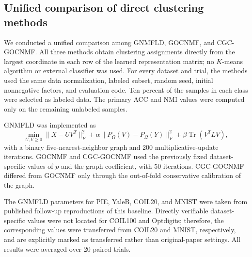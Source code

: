 \subsection{Unified comparison of direct clustering methods}
\label{subsec:unified_direct_comparison}

We conducted a unified comparison among GNMFLD, GOCNMF, and
CGC-GOCNMF. All three methods obtain clustering assignments directly from the
largest coordinate in each row of the learned representation matrix; no
\(K\)-means algorithm or external classifier was used. For every dataset and
trial, the methods used the same data normalization, labeled subset, random
seed, initial nonnegative factors, and evaluation code. Ten percent of the
samples in each class were selected as labeled data. The primary ACC and NMI
values were computed only on the remaining unlabeled samples.

GNMFLD was implemented as
\[
\min_{U,V\geq0}
 \|X-UV^{T}\|_{F}^{2}
 +\alpha\|P_{\Omega}(V)-P_{\Omega}(Y)\|_{F}^{2}
 +\beta\operatorname{Tr}(V^{T}LV),
\]
with a binary five-nearest-neighbor graph and 200 multiplicative-update
iterations. GOCNMF and CGC-GOCNMF used the previously fixed dataset-specific
values of \(p\) and the graph coefficient, with 50 iterations. CGC-GOCNMF
differed from GOCNMF only through the out-of-fold conservative calibration of
the graph.

The GNMFLD parameters for PIE, YaleB, COIL20, and MNIST were taken from
published follow-up reproductions of this baseline. Directly verifiable
dataset-specific values were not located for COIL100 and Optdigits; therefore,
the corresponding values were transferred from COIL20 and MNIST,
respectively, and are explicitly marked as transferred rather than
original-paper settings. All results were averaged over 20 paired trials.

